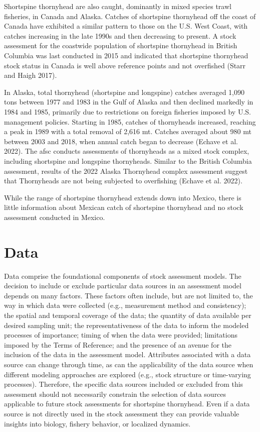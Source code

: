 \documentclass[11pt,
  english,
  letterpaper,
]{article}
\begin{document}
Shortspine thornyhead are also caught, dominantly in mixed species trawl fisheries, in Canada and Alaska. Catches of shortspine thornyhead off the coast of Canada have exhibited a similar pattern to those on the U.S. West Coast, with catches increasing in the late 1990s and then decreasing to present. A stock assessment for the coastwide population of shortspine thornyhead in British Columbia was last conducted in 2015 and indicated that shortspine thornyhead stock status in Canada is well above reference points and not overfished (Starr and Haigh 2017).

In Alaska, total thornyhead (shortspine and longspine) catches averaged 1,090 tons between 1977 and 1983 in the Gulf of Alaska and then declined markedly in 1984 and 1985, primarily due to restrictions on foreign fisheries imposed by U.S. management policies. Starting in 1985, catches of thornyheads increased, reaching a peak in 1989 with a total removal of 2,616 mt. Catches averaged about 980 mt between 2003 and 2018, when annual catch began to decrease (Echave et al. 2022). The \gls{afsc} conducts assessments of thornyheads as a mixed stock complex, including shortspine and longspine thornyheads. Similar to the British Columbia assessment, results of the 2022 Alaska Thornyhead complex assessment suggest that Thornyheads are not being subjected to overfishing (Echave et al. 2022).

While the range of shortspine thornyhead extends down into Mexico, there is little information about Mexican catch of shortspine thornyhead and no stock assessment conducted in Mexico.

\hypertarget{data}{%
\section{Data}\label{data}}

Data comprise the foundational components of stock assessment models. The decision to include or exclude particular data sources in an assessment model depends on many factors. These factors often include, but are not limited to, the way in which data were collected (e.g., measurement method and consistency); the spatial and temporal coverage of the data; the quantity of data available per desired sampling unit; the representativeness of the data to inform the modeled processes of importance; timing of when the data were provided; limitations imposed by the Terms of Reference; and the presence of an avenue for the inclusion of the data in the assessment model. Attributes associated with a data source can change through time, as can the applicability of the data source when different modeling approaches are explored (e.g., stock structure or time-varying processes). Therefore, the specific data sources included or excluded from this assessment should not necessarily constrain the selection of data sources applicable to future stock assessments for shortspine thornyhead. Even if a data source is not directly used in the stock assessment they can provide valuable insights into biology, fishery behavior, or localized dynamics.
\end{document}
